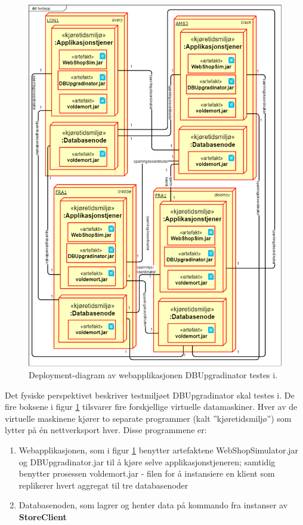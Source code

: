 \begin{figure}[hbtp]
  \centering
  \includegraphics[scale=0.4]{fig/dbupgradinator-physical.png}
  \caption{Deployment-diagram av webapplikasjonen DBUpgradinator testes i.}
  \label{fig10}
\end{figure}

Det fysiske perspektivet beskriver testmiljøet DBUpgradinator skal testes i. De fire boksene i figur \ref{fig10} tilsvarer fire forskjellige virtuelle datamaskiner. Hver av de virtuelle maskinene kjører to separate programmer (kalt ''kjøretidsmiljø'') som lytter på én nettverksport hver. Disse programmene er:

\begin{enumerate}
  \item Webapplikasjonen, som i figur \ref{fig10} benytter artefaktene WebShopSimulator.jar og DBUpgradinator.jar til å kjøre selve applikasjonstjeneren; samtidig benytter prosessen voldemort.jar - filen for å instansiere en klient som replikerer hvert aggregat til tre databasenoder
  \item Databasenoden, som lagrer og henter data på kommando fra instanser av \textbf{StoreClient}
\end{enumerate}

